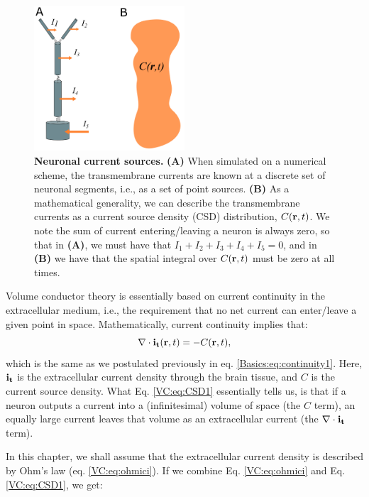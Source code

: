 \begin{figure}[!ht]
\begin{center}
\includegraphics[width=0.5\textwidth]{Figures/VC/CSD.png}
\end{center}
\caption{\textbf{Neuronal current sources.}  {\bf (A)} When simulated on a numerical scheme, the transmembrane currents are known at a discrete set of neuronal segments, i.e., as a set of point sources.  {\bf (B)} As a mathematical generality, we can describe the transmembrane currents as a current source density (CSD) distribution, $C({\bf r},t)$. We note the sum of current entering/leaving a neuron is always zero, so that in {\bf (A)}, we must have that $I_1 + I_2 + I_3 + I_4 + I_5= 0$, and in {\bf (B)} we have that the spatial integral over $C({\bf r},t)$ must be zero at all times.
}
\label{VC:fig:CSD}
\end{figure}
Volume conductor theory is essentially based on current continuity in the extracellular medium, i.e., the requirement that no net current can enter/leave a given point in space. Mathematically, current continuity implies that:
\begin{equation}
\nabla \cdot {\bf i_t}({\bf r}, t) = - C({\bf r}, t),
\label{VC:eq:CSD1}
\end{equation}
which is the same as we postulated previously in eq. \ref{Basics:eq:continuity1}. Here, ${\bf i_t}$ is the extracellular current density through the brain tissue, and $C$ is the current source density. What Eq. \ref{VC:eq:CSD1} essentially tells us, is that if a neuron outputs a current into a (infinitesimal) volume of space (the $C$ term), an equally large current leaves that volume as an extracellular current (the $\nabla \cdot {\bf i_t}$ term).

In this chapter, we shall assume that the extracellular current density is described by Ohm's law (eq. \ref{VC:eq:ohmici}). If we combine Eq. \ref{VC:eq:ohmici} and Eq. \ref{VC:eq:CSD1}, we get:

